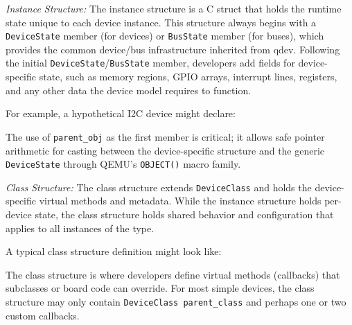 \textit{Instance Structure:} The instance structure is a C struct that holds the runtime state unique to each device instance. This structure always begins with a \texttt{DeviceState} member (for devices) or \texttt{BusState} member (for buses), which provides the common device/bus infrastructure inherited from qdev. Following the initial \texttt{DeviceState}/\texttt{BusState} member, developers add fields for device-specific state, such as memory regions, GPIO arrays, interrupt lines, registers, and any other data the device model requires to function.

For example, a hypothetical I2C device might declare:


The use of \texttt{parent\_obj} as the first member is critical; it allows safe pointer arithmetic for casting between the device-specific structure and the generic \texttt{DeviceState} through QEMU's \texttt{OBJECT()} macro family.

\textit{Class Structure:} The class structure extends \texttt{DeviceClass} and holds the device-specific virtual methods and metadata. While the instance structure holds per-device state, the class structure holds shared behavior and configuration that applies to all instances of the type.

A typical class structure definition might look like:


The class structure is where developers define virtual methods (callbacks) that subclasses or board code can override. For most simple devices, the class structure may only contain \texttt{DeviceClass parent\_class} and perhaps one or two custom callbacks.

